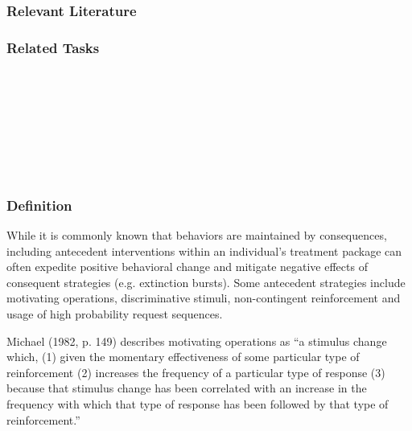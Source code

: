 \subsection{Relevant Literature}
\begin{refsection}
\nocite{cooper2007applied,
        cowdery1990effects,
        deitz1977analysis,
        deitz1983reducing,
        hanley2001reinforcement,
        kahng2001assessment,
        lalli1995reducing,
        lindberg1999dro,
        mazaleski1993analysis,
        petscher2009review,
        rehfeldt2003functional,
        seys1978improving,
        vollmer1992differential,
        vollmer1999evaluating}
\printbibliography[heading=none]
\end{refsection}
\subsection{Related Tasks} 
\fourcOne{}\\
\fourdTwo{}\\
\fourdNineteen{}\\
\fourfSeven{}\\
\fouriSeven{}\\
\fourjTwo{}\\
%
%
%
%
%
%
%
%
%
%
%
\chapter{\foursece{}}
%
\section[\foureOne{}]{\foureOne{}%
              }
\subsection{Definition}
While it is commonly known that behaviors are maintained by consequences, including antecedent interventions within an individual's treatment package can often expedite positive behavioral change and mitigate negative effects of consequent strategies (e.g. extinction bursts). Some antecedent strategies include motivating operations, discriminative stimuli, non-contingent reinforcement and usage of high probability request sequences.

Michael (1982, p. 149) describes motivating operations as ``a stimulus change which, (1) given the momentary effectiveness of some particular type of reinforcement (2) increases the frequency of a particular type of response (3) because that stimulus change has been correlated with an increase in the frequency with which that type of response has been followed by that type of reinforcement.''

